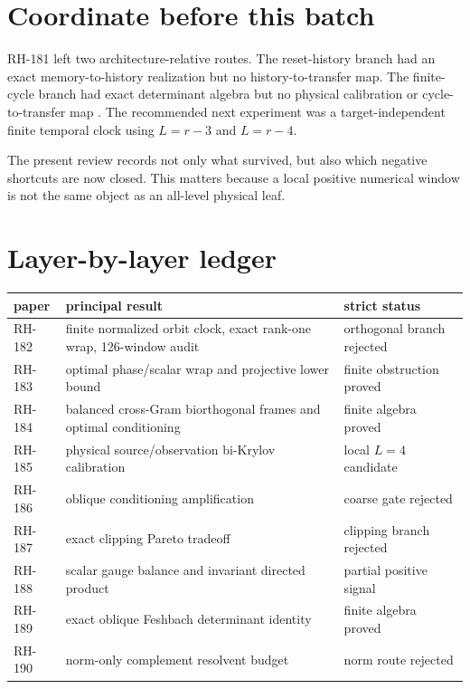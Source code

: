 \documentclass[12pt]{article}
\theoremstyle{remark}
\begin{document}
\section{Coordinate before this batch}

RH-181 left two architecture-relative routes.  The reset-history branch had
an exact memory-to-history realization but no history-to-transfer map.  The
finite-cycle branch had exact determinant algebra but no physical calibration
or cycle-to-transfer map \citep{WangRH181}.  The recommended next experiment
was a target-independent finite temporal clock using $L=r-3$ and $L=r-4$.

The present review records not only what survived, but also which negative
shortcuts are now closed.  This matters because a local positive numerical
window is not the same object as an all-level physical leaf.

\section{Layer-by-layer ledger}

\begin{center}
\small
\begin{tabular}{p{}p{}p{}}
\toprule
paper & principal result & strict status\\
\midrule
RH-182 & finite normalized orbit clock, exact rank-one wrap, 126-window audit
& orthogonal branch rejected\\
RH-183 & optimal phase/scalar wrap and projective lower bound
& finite obstruction proved\\
RH-184 & balanced cross-Gram biorthogonal frames and optimal conditioning
& finite algebra proved\\
RH-185 & physical source/observation bi-Krylov calibration
& local $L=4$ candidate\\
RH-186 & oblique conditioning amplification
& coarse gate rejected\\
RH-187 & exact clipping Pareto tradeoff
& clipping branch rejected\\
RH-188 & scalar gauge balance and invariant directed product
& partial positive signal\\
RH-189 & exact oblique Feshbach determinant identity
& finite algebra proved\\
RH-190 & norm-only complement resolvent budget
& norm route rejected\\
\bottomrule
\end{tabular}
\end{center}
\end{document}
